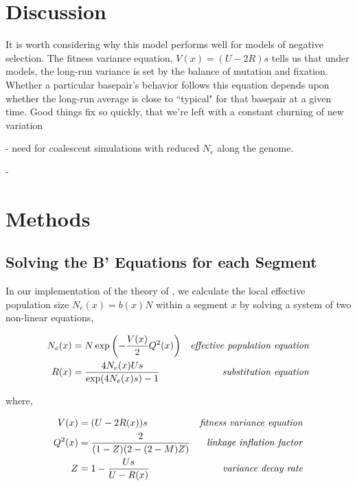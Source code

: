 \documentclass[11pt]{article}
\begin{document}
\section*{Discussion}

It is worth considering why this model performs well for models of negative
selection. The fitness variance equation, $V(x) = (U-2R)s$ tells us that under
models, the long-run variance is set by the balance of mutation and fixation.
Whether a particular basepair's behavior follows this equation depends upon
whether the long-run average is close to ``typical" for that basepair at a
given time. Good things fix so quickly, that we're left with a constant
churning of new variation

- need for coalescent simulations with reduced $N_e$ along the genome.

-  


\section*{Methods}

\subsection*{Solving the B' Equations for each Segment}

In our implementation of the theory of \textcite{Santiago2016-mu}, we calculate
the local effective population size $N_e(x) = b(x) N$ within a segment $x$ by
solving a system of two non-linear equations, 

\begin{align}
  \label{eq:}
  {N}_{e}(x) &= N \exp \left( -\frac{V(x)}{2} Q^2(x) \right) & \text{\emph{effective population equation}} \\
  {R}(x) &= \frac{4N_e(x)U s}{\exp(4 N_e(x) s)-1}  & \text{\emph{substitution equation}} 
\end{align}

where,

\begin{align}
  V(x) &= (U  - 2 {R}(x)) s & \text{\emph{fitness variance equation}} \\
  Q^2(x) &= \frac{2}{(1-Z)(2-(2-M)Z)} & \text{\emph{linkage inflation factor}} \\
  Z &= 1 - \frac{Us}{U-{R(x)}} & \text{\emph{}} \text{\emph{variance decay rate}}
\end{align}
\end{document}

